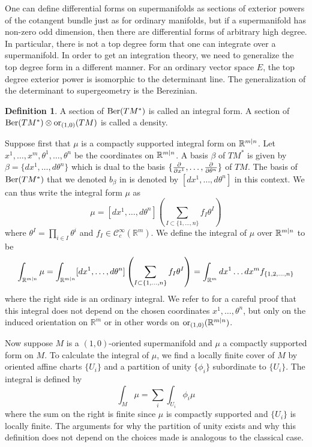 \documentclass[11pt]{amsart}
\numberwithin{equation}{section}
\numberwithin{figure}{section}
\theoremstyle{plain}
\theoremstyle{definition}
\newtheorem{defn}[thm]{Definition}
\theoremstyle{remark}
\begin{document}
One can define differential forms on supermanifolds as sections of
exterior powers of the cotangent bundle just as for ordinary manifolds,
but if a supermanifold has non-zero odd dimension, then there are
differential forms of arbitrary high degree. In particular, there
is not a top degree form that one can integrate over a supermanifold.
In order to get an integration theory, we need to generalize the top
degree form in a different manner. For an ordinary vector space $E$,
the top degree exterior power is isomorphic to the determinant line.
The generalization of the determinant to supergeometry is the Berezinian. 
\begin{defn}
A section of $\mathrm{Ber}(TM^{*})$ is called an integral form. A section
of $\mathrm{Ber}(TM^{*})\otimes\mathrm{or}_{(1,0)}(TM)$ is called a density.
\end{defn}
Suppose first that $\mu$ is a compactly supported integral form on
$\mathbb{R}^{m|n}$. Let $x^{1},\dots,x^{m},\theta^{1},\dots,\theta^{n}$
be the coordinates on $\mathbb{R}^{m|n}$. A basis $\beta$ of $TM^{*}$ is
given by $\beta=\{dx^{1},\dots,d\theta^{n}\}$ which is dual to the
basis $\{\frac{\partial}{\partial x^{1}},\dots,\frac{\partial}{\partial\theta^{n}}\}$ of $TM$. The basis of
$\mathrm{Ber}(TM^{*})$ that we denoted $b_{\beta}$ in  
is denoted by $[dx^{1},\dots,d\theta^{n}]$ in this context. We can
thus write the integral form $\mu$ as 
\[
\mu=[dx^{1},\dots,d\theta^{n}]\left(\sum_{I\subset\{1,\dots,n\}}f_{I}\theta^{I}\right)
\]
where $\theta^{I}=\prod_{i\in I}\theta^{i}$ and $f_{I}\in\mathcal{C}_{c}^{\infty}(\mathbb{R}^{m})$.
We define the integral of $\mu$ over $\mathbb{R}^{m|n}$ to be
\[
\int_{\mathbb{R}^{m|n}}\mu=\int_{\mathbb{R}^{m|n}}[dx^{1},\dots,d\theta^{n}]\left(\sum_{I\subset\{1,\dots,n\}}f_{I}\theta^{I}\right)=\int_{\mathbb{R}^{m}}dx^{1}\dots dx^{m}f_{\{1,2,\dots,n\}}
\]
where the right side is an ordinary integral. We refer to \cite{GaugeFieldTheory}
for a careful proof that this integral does not depend on the chosen
coordinates $x^{1},\dots,\theta^{n}$, but only on the induced orientation
on $\mathbb{R}^{m}$ or in other words on $\mathrm{or}_{(1,0)}(\mathbb{R}^{m|n})$.

Now suppose $M$ is a $(1,0)$-oriented supermanifold and $\mu$ a
compactly supported form on $M$. To calculate the integral of $\mu$,
we find a locally finite cover of $M$ by oriented affine charts $\{U_{i}\}$
and a partition of unity $\{\phi_{i}\}$ subordinate to $\{U_{i}\}$.
The integral is defined by 
\[
\int_{M}\mu=\sum_{i}\int_{U_{i}}\phi_{i}\mu
\]
where the sum on the right is finite since $\mu$ is compactly supported
and $\{U_{i}\}$ is locally finite. The arguments for why the partition
of unity exists and why this definition does not depend on the choices
made is analogous to the classical case. 
\end{document}
